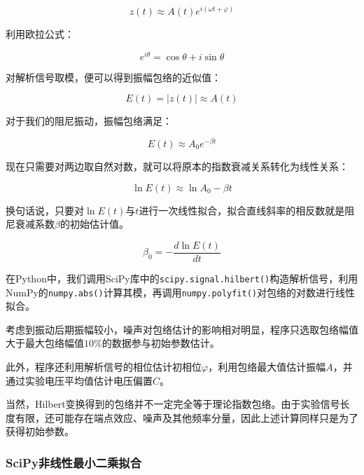 \documentclass[UTF8]{ctexart}
\begin{document}
\begin{equation}
z(t)\approx A(t)e^{i(\omega t+\varphi)}
\end{equation}

\noindent 利用欧拉公式：

\begin{equation}
e^{i\theta}=\cos\theta+i\sin\theta
\end{equation}

\noindent 对解析信号取模，便可以得到振幅包络的近似值：

\begin{equation}
\boxed{E(t)=|z(t)|\approx A(t)}
\end{equation}

\noindent 对于我们的阻尼振动，振幅包络满足：

\begin{equation}
E(t)\approx A_0e^{-\beta t}
\end{equation}

\noindent 现在只需要对两边取自然对数，就可以将原本的指数衰减关系转化为线性关系：

\begin{equation}
\ln E(t)\approx\ln A_0-\beta t
\end{equation}

\noindent 换句话说，只要对$\ln E(t)$与$t$进行一次线性拟合，拟合直线斜率的相反数就是阻尼衰减系数$\beta$的初始估计值。

\begin{equation}
\boxed{\beta_0=-\frac{d\ln E(t)}{dt}}
\end{equation}

\noindent 在Python中，我们调用SciPy库中的\texttt{scipy.signal.hilbert()}构造解析信号，利用NumPy的\texttt{numpy.abs()}计算其模，再调用\texttt{numpy.polyfit()}对包络的对数进行线性拟合。

\noindent 考虑到振动后期振幅较小，噪声对包络估计的影响相对明显，程序只选取包络幅值大于最大包络幅值$10\%$的数据参与初始参数估计。

\noindent 此外，程序还利用解析信号的相位估计初相位$\varphi$，利用包络最大值估计振幅$A$，并通过实验电压平均值估计电压偏置$C$。

\noindent 当然，Hilbert变换得到的包络并不一定完全等于理论指数包络。由于实验信号长度有限，还可能存在端点效应、噪声及其他频率分量，因此上述计算同样只是为了获得初始参数。

\subsubsection{SciPy非线性最小二乘拟合}
\end{document}
